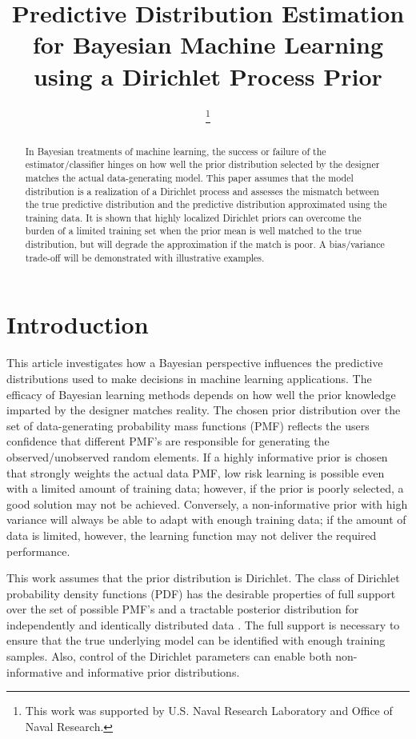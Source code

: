 \documentclass[conference]{IEEEtran}
\title{Predictive Distribution Estimation for Bayesian Machine Learning using a Dirichlet Process Prior}
\author{
\IEEEauthorblockN{Paul Rademacher}
\IEEEauthorblockA{U.S. Naval Research Laboratory\\Radar Division\\Washington, DC 20375, USA}
\thanks{This work was supported by U.S. Naval Research Laboratory and Office of Naval Research.}
\and
\IEEEauthorblockN{Milo\v{s} Doroslova\v{c}ki}
\IEEEauthorblockA{The George Washington University\\Department of Electrical and Computer Engineering\\Washington, DC 20052, USA}
}
\begin{document}
\maketitle


\begin{abstract}
In Bayesian treatments of machine learning, the success or failure of the estimator/classifier hinges on how well the prior distribution selected by the designer matches the actual data-generating model. This paper assumes that the model distribution is a realization of a Dirichlet process and assesses the mismatch between the true predictive distribution and the predictive distribution approximated using the training data. It is shown that highly localized Dirichlet priors can overcome the burden of a limited training set when the prior mean is well matched to the true distribution, but will degrade the approximation if the match is poor. A bias/variance trade-off will be demonstrated with illustrative examples.
\end{abstract}


\section{Introduction}

This article investigates how a Bayesian perspective influences the predictive distributions used to make decisions in machine learning applications. The efficacy of Bayesian learning methods depends on how well the prior knowledge imparted by the designer matches reality. The chosen prior distribution over the set of data-generating probability mass functions (PMF) reflects the users confidence that different PMF's are responsible for generating the observed/unobserved random elements. If a highly informative prior is chosen that strongly weights the actual data PMF, low risk learning is possible even with a limited amount of training data; however, if the prior is poorly selected, a good solution may not be achieved. Conversely, a non-informative prior with high variance will always be able to adapt with enough training data; if the amount of data is limited, however, the learning function may not deliver the required performance.

This work assumes that the prior distribution is Dirichlet. The class of Dirichlet probability density functions (PDF) has the desirable properties of full support over the set of possible PMF's and a tractable posterior distribution for independently and identically distributed data \cite{ferguson}. The full support is necessary to ensure that the true underlying model can be identified with enough training samples. Also, control of the Dirichlet parameters can enable both non-informative and informative prior distributions. 
\end{document}
